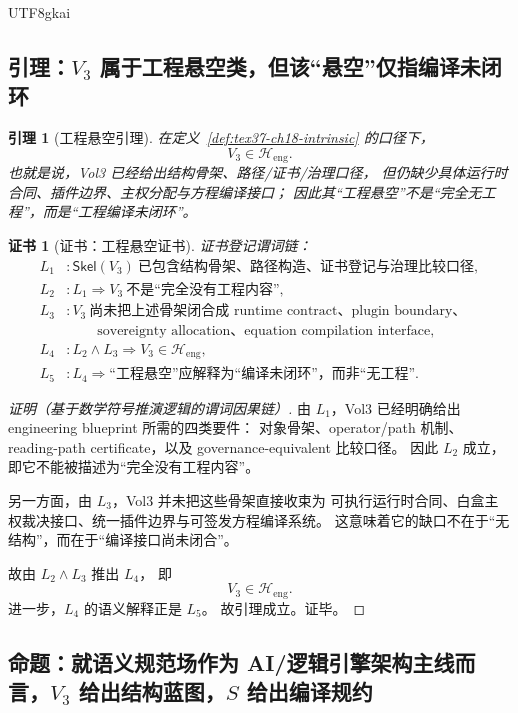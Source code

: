 \documentclass[12pt]{article}
\newtheorem{lemma}{引理}[section]
\newtheorem{Certificate}{证书}[section]
\begin{document}
\begin{CJK*}{UTF8}{gkai}
\subsection[引理：工程悬空引理]{引理：$V_3$ 属于工程悬空类，但该“悬空”仅指编译未闭环}
\label{subsec:tex37-ch18-lemma}

\begin{lemma}[工程悬空引理]
\label{lem:tex37-ch18-pre}
在定义~\ref{def:tex37-ch18-intrinsic} 的口径下，
\[
  V_3\in \mathcal H_{\mathrm{eng}}.
\]
也就是说，Vol3 已经给出结构骨架、路径/证书/治理口径，
但仍缺少具体运行时合同、插件边界、主权分配与方程编译接口；
因此其“工程悬空”不是“完全无工程”，而是“工程编译未闭环”。
\end{lemma}

\begin{Certificate}[证书：工程悬空证书]
\label{cert:tex37-ch18-pre}
证书登记谓词链：
\[
\begin{aligned}
  L_1 &: \mathsf{Skel}(V_3)\ \text{已包含结构骨架、路径构造、证书登记与治理比较口径},\\
  L_2 &: L_1\Rightarrow V_3\ \text{不是“完全没有工程内容”},\\
  L_3 &: V_3\ \text{尚未把上述骨架闭合成 runtime contract、plugin boundary、}\\
      &\qquad\ \text{sovereignty allocation、equation compilation interface},\\
  L_4 &: L_2\wedge L_3\Rightarrow V_3\in \mathcal H_{\mathrm{eng}},\\
  L_5 &: L_4\Rightarrow \text{“工程悬空”应解释为“编译未闭环”，而非“无工程”}.
\end{aligned}
\]
\end{Certificate}

\begin{proof}[证明（基于数学符号推演逻辑的谓词因果链）]
由 $L_1$，Vol3 已经明确给出 engineering blueprint 所需的四类要件：
对象骨架、operator/path 机制、reading-path certificate，以及 governance-equivalent 比较口径。
因此 $L_2$ 成立，即它不能被描述为“完全没有工程内容”。

另一方面，由 $L_3$，Vol3 并未把这些骨架直接收束为
可执行运行时合同、白盒主权裁决接口、统一插件边界与可签发方程编译系统。
这意味着它的缺口不在于“无结构”，而在于“编译接口尚未闭合”。

故由 $L_2\wedge L_3$ 推出 $L_4$，
即
\[
  V_3\in \mathcal H_{\mathrm{eng}}.
\]
进一步，$L_4$ 的语义解释正是 $L_5$。
故引理成立。证毕。
\end{proof}

\subsection[命题：结构蓝图与编译规约]{命题：就语义规范场作为 AI/逻辑引擎架构主线而言，$V_3$ 给出结构蓝图，$S$ 给出编译规约}
\label{subsec:tex37-ch18-proposition}


\end{CJK*}
\end{document}
